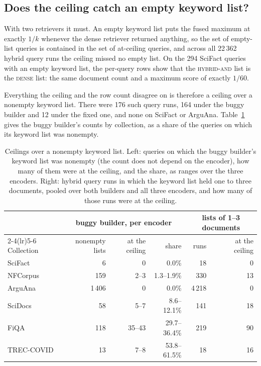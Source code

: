 \documentclass[11pt]{article}
\begin{document}
\subsection{Does the ceiling catch an empty keyword list?}
\label{sec:rowcount}

With two retrievers it must. An empty keyword list puts the fused maximum at exactly $1/k$ whenever the dense retriever returned anything, so the set of empty-list queries is contained in the set of at-ceiling queries, and across all 22\,362 hybrid query runs the ceiling missed no empty list. On the 294 SciFact queries with an empty keyword list, the per-query rows show that the \textsc{hybrid-and} list is the \textsc{dense} list: the same document count and a maximum score of exactly $1/60$.

Everything the ceiling and the row count disagree on is therefore a ceiling over a nonempty keyword list. There were 176 such query runs, 164 under the buggy builder and 12 under the fixed one, and none on SciFact or ArguAna. Table~\ref{tab:excess} gives the buggy builder's counts by collection, as a share of the queries on which its keyword list was nonempty.

\begin{table}[h]
\centering
\small
\begin{tabular}{lrrrrr}
\toprule
 & \multicolumn{3}{c}{buggy builder, per encoder} & \multicolumn{2}{c}{lists of 1--3 documents} \\
\cmidrule(lr){2-4}\cmidrule(lr){5-6}
Collection & nonempty lists & at the ceiling & share & runs & at the ceiling \\
\midrule
SciFact & 6 & 0 & 0.0\% & 18 & 0 \\
NFCorpus & 159 & 2--3 & 1.3--1.9\% & 330 & 13 \\
ArguAna & 1\,406 & 0 & 0.0\% & 4\,218 & 0 \\
SciDocs & 58 & 5--7 & 8.6--12.1\% & 141 & 18 \\
FiQA & 118 & 35--43 & 29.7--36.4\% & 219 & 90 \\
TREC-COVID & 13 & 7--8 & 53.8--61.5\% & 18 & 16 \\
\bottomrule
\end{tabular}
\caption{Ceilings over a nonempty keyword list. Left: queries on which the buggy builder's keyword list was nonempty (the count does not depend on the encoder), how many of them were at the ceiling, and the share, as ranges over the three encoders. Right: hybrid query runs in which the keyword list held one to three documents, pooled over both builders and all three encoders, and how many of those runs were at the ceiling.}
\label{tab:excess}
\end{table}
\end{document}
